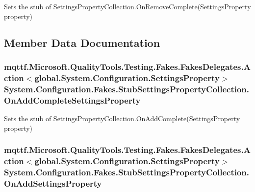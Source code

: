 Sets the stub of Settings\-Property\-Collection.\-On\-Remove\-Complete(\-Settings\-Property property)



\subsection{Member Data Documentation}
\hypertarget{class_system_1_1_configuration_1_1_fakes_1_1_stub_settings_property_collection_aa60c781b047ad98a52b60218fc7d6e89}{
\subsubsection[{On\-Add\-Complete\-Settings\-Property}]{\setlength{\rightskip}{0pt plus 5cm}mqttf.\-Microsoft.\-Quality\-Tools.\-Testing.\-Fakes.\-Fakes\-Delegates.\-Action$<$global.\-System.\-Configuration.\-Settings\-Property$>$ System.\-Configuration.\-Fakes.\-Stub\-Settings\-Property\-Collection.\-On\-Add\-Complete\-Settings\-Property}}\label{class_system_1_1_configuration_1_1_fakes_1_1_stub_settings_property_collection_aa60c781b047ad98a52b60218fc7d6e89}


Sets the stub of Settings\-Property\-Collection.\-On\-Add\-Complete(\-Settings\-Property property)

\hypertarget{class_system_1_1_configuration_1_1_fakes_1_1_stub_settings_property_collection_a8b6a50a1d95d8d792ae6ddb1ef778930}{
\subsubsection[{On\-Add\-Settings\-Property}]{\setlength{\rightskip}{0pt plus 5cm}mqttf.\-Microsoft.\-Quality\-Tools.\-Testing.\-Fakes.\-Fakes\-Delegates.\-Action$<$global.\-System.\-Configuration.\-Settings\-Property$>$ System.\-Configuration.\-Fakes.\-Stub\-Settings\-Property\-Collection.\-On\-Add\-Settings\-Property}}\label{class_system_1_1_configuration_1_1_fakes_1_1_stub_settings_property_collection_a8b6a50a1d95d8d792ae6ddb1ef778930}


